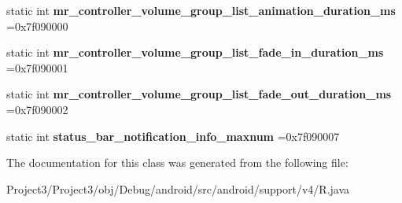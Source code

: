 \begin{DoxyCompactItemize}
\mbox{\label{classandroid_1_1support_1_1v4_1_1R_1_1integer_a81581f3a45591fd5d5677f3ef3b8811f}} 
static int {\bfseries mr\+\_\+controller\+\_\+volume\+\_\+group\+\_\+list\+\_\+animation\+\_\+duration\+\_\+ms} =0x7f090000
\item 
\mbox{\label{classandroid_1_1support_1_1v4_1_1R_1_1integer_a5ac4a54dc8ac5c1d0b96e042c926ec8f}} 
static int {\bfseries mr\+\_\+controller\+\_\+volume\+\_\+group\+\_\+list\+\_\+fade\+\_\+in\+\_\+duration\+\_\+ms} =0x7f090001
\item 
\mbox{\label{classandroid_1_1support_1_1v4_1_1R_1_1integer_a327a3b8f3f13d3604ea610e8151377c3}} 
static int {\bfseries mr\+\_\+controller\+\_\+volume\+\_\+group\+\_\+list\+\_\+fade\+\_\+out\+\_\+duration\+\_\+ms} =0x7f090002
\item 
\mbox{\label{classandroid_1_1support_1_1v4_1_1R_1_1integer_ad0e56ee4666c30a74379916fec24f905}} 
static int {\bfseries status\+\_\+bar\+\_\+notification\+\_\+info\+\_\+maxnum} =0x7f090007
\end{DoxyCompactItemize}


The documentation for this class was generated from the following file\+:\begin{DoxyCompactItemize}
\item 
Project3/\+Project3/obj/\+Debug/android/src/android/support/v4/R.\+java\end{DoxyCompactItemize}
